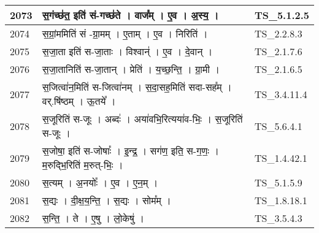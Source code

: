 \documentclass[17pt]{extarticle}
\begin{document}
\begin{longtable}{||p{0.4in}||p{4.9in}||p{0.9in}||}
    \hline
        
    2073 & स॒गंच्छ॑त॒ इति॑ सं{-}गच्छ॑ते   ।   वाज᳚म्   ।   ए॒व   ।   अ॒स्य॒   ।    & TS\_5.1.2.5       \\
    
    \hline
        
    2074 & स॒ग्रां॒ममिति॑ सं {-}ग्रा॒मम्   ।   ए॒ताम्   ।   ए॒व   ।   निरिति॑   ।    & TS\_2.2.8.3       \\
    
    \hline
        
    2075 & स॒जा॒ता इति॑ स{-}जा॒ताः   ।   विश्वान्॑   ।   ए॒व   ।   दे॒वान्   ।    & TS\_2.1.7.6       \\
    
    \hline
        
    2076 & स॒जा॒तानिति॑ स{-}जा॒तान्   ।   प्रेति॑   ।   य॒च्छ॒न्ति॒   ।   ग्रा॒मी   ।    & TS\_2.1.6.5       \\
    
    \hline
        
    2077 & स॒जित्वा॑न॒मिति॑ स{-}जित्वा॑नम्   ।   स॒दा॒सह॒मिति॑ सदा{-}सह᳚म्   ।   वर्.षि॑ष्ठम्   ।   ऊ॒तये᳚   ।    & TS\_3.4.11.4       \\
    
    \hline
        
    2078 & स॒जूरिति॑ स{-}जूः   ।   अब्दः॑   ।   अया॑वभि॒रित्यया॑व{-}भिः॒   ।   स॒जूरिति॑ स{-}जूः   ।    & TS\_5.6.4.1       \\
    
    \hline
        
    2079 & स॒जोषा॒ इति॑ स{-}जोषाः᳚   ।   इ॒न्द्र॒   ।   सग॑ण॒ इति॒ स{-}ग॒णः॒   ।   म॒रुद्भि॒रिति॑ म॒रुत्{-}भिः॒   ।    & TS\_1.4.42.1       \\
    
    \hline
        
    2080 & स॒त्यम्   ।   अ॒नयोः᳚   ।   ए॒व   ।   ए॒न॒म्   ।    & TS\_5.1.5.9       \\
    
    \hline
        
    2081 & स॒द्यः   ।   दी॒क्ष॒य॒न्ति॒   ।   स॒द्यः   ।   सोम᳚म्   ।    & TS\_1.8.18.1       \\
    
    \hline
        
    2082 & स॒न्ति॒   ।   ते   ।   ए॒षु   ।   लो॒केषु॑   ।    & TS\_3.5.4.3       \\
    
    \hline
        

\end{longtable}
\end{document}
